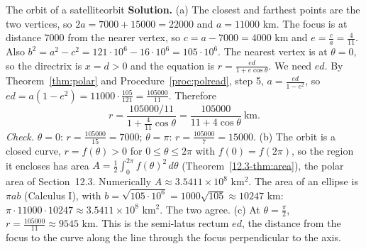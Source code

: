 \documentclass[11pt]{article}
\begin{document}
\begin{exmp}{The orbit of a satellite}{orbit}
\textbf{Solution.} (a) The closest and farthest points are the two vertices, so $2a=7000+15000=22000$ and $a=11000$ km. The focus is at distance $7000$ from the nearer vertex, so $c=a-7000=4000$ km and $e=\frac ca=\frac4{11}$. Also $b^2=a^2-c^2=121\cdot10^6-16\cdot10^6=105\cdot10^6$. The nearest vertex is at $\theta=0$, so the directrix is $x=d>0$ and the equation is $r=\frac{ed}{1+e\cos\theta}$. We need $ed$. By Theorem~\ref{thm:polar} and Procedure~\ref{proc:polread}, step 5, $a=\frac{ed}{1-e^2}$, so $ed=a\left(1-e^2\right)=11000\cdot\frac{105}{121}=\frac{105000}{11}$. Therefore
\[
r=\frac{105000/11}{1+\frac4{11}\cos\theta}=\frac{105000}{11+4\cos\theta}\ \text{km.}
\]
\emph{Check.} $\theta=0$: $r=\frac{105000}{15}=7000$; $\theta=\pi$: $r=\frac{105000}7=15000$.
(b) The orbit is a closed curve, $r=f(\theta)>0$ for $0\le\theta\le2\pi$ with $f(0)=f(2\pi)$, so the region it encloses has area $A=\frac12\int_0^{2\pi}f(\theta)^2\,d\theta$ (Theorem~\ref{12.3-thm:area}), the polar area of Section~12.3. Numerically $A\approx3.5411\times10^8$ km$^2$. The area of an ellipse is $\pi ab$ (Calculus I), with $b=\sqrt{105\cdot10^6}=1000\sqrt{105}\approx10247$ km: $\pi\cdot11000\cdot10247\approx3.5411\times10^8$ km$^2$. The two agree.
(c) At $\theta=\frac\pi2$, $r=\frac{105000}{11}\approx9545$ km. This is the semi-latus rectum $ed$, the distance from the focus to the curve along the line through the focus perpendicular to the axis.


\end{exmp}
\end{document}
